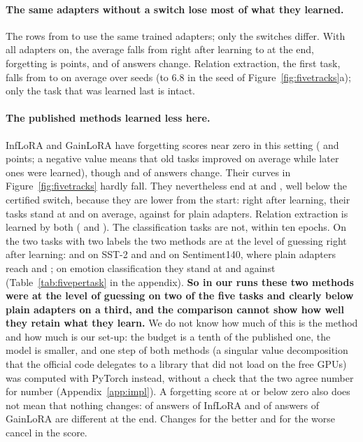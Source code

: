\paragraph{The same adapters without a switch lose most of what they learned.} The rows from \cert{} to \plain{} use the same trained adapters; only the switches
differ. With all adapters on, the average falls from \FivePlainLearned{} right after learning to
\FivePlainAP{} at the end, forgetting is \FivePlainFT{} points, and \FivePlainChanged{} of
\FivePlainCompared{} answers change. Relation extraction, the first task, falls from
\FivePlainRelationLearned{} to \FivePlainRelationEnd{} on average over seeds (to 6.8 in the seed of
Figure~\ref{fig:fivetracks}a); only the task that was learned last is intact.

\paragraph{The published methods learned less here.} InfLoRA and GainLoRA have forgetting scores near zero in this setting
(\FiveInfFT{} and \FiveGainFT{} points; a
negative value means that old tasks improved on average while later ones were learned), though \FiveInfChanged{} and \FiveGainChanged{} of \FiveInfCompared{} answers change. Their curves
in Figure~\ref{fig:fivetracks} hardly fall. They nevertheless end at \FiveInfAP{}
and \FiveGainAP{}, well below the certified switch, because they are lower from the start: right
after learning, their tasks stand at \FiveInfLearned{} and \FiveGainLearned{} on average, against
\FiveCertLearned{} for plain adapters. Relation extraction is learned by both
(\FiveInfRelationLearned{} and \FiveGainRelationLearned{}). The classification tasks are not, within
ten epochs. On the two tasks with two labels the two methods are at the level of guessing right
after learning: \FiveInfSstLearned{} and \FiveGainSstLearned{} on SST-2 and
\FiveInfSentimentLearned{} and \FiveGainSentimentLearned{} on Sentiment140, where plain adapters
reach \FivePlainSstLearned{} and \FivePlainSentimentLearned{}; on emotion classification they stand
at \FiveInfEmotionLearned{} and \FiveGainEmotionLearned{} against \FivePlainEmotionLearned{}
(Table~\ref{tab:fivepertask} in the appendix). \textbf{So in our runs these two methods were at the level of guessing on two of the five tasks and clearly below plain adapters on a third, and the comparison cannot show how well they retain what they learn.} We do not know how much of this is the method and how much is our set-up: the budget is a
tenth of the published one, the model is smaller, and one step of both methods (a singular value
decomposition that the official code delegates to a library that did not load on the free GPUs) was
computed with PyTorch instead, without a check that the two agree number for number
(Appendix~\ref{app:impl}). A forgetting score at or
below zero also does not mean that nothing changes: \FiveInfChanged{} of \FiveInfCompared{} answers of
InfLoRA and \FiveGainChanged{} of \FiveGainCompared{} answers of GainLoRA are different at the end.
Changes for the better and for the worse cancel in the score.

